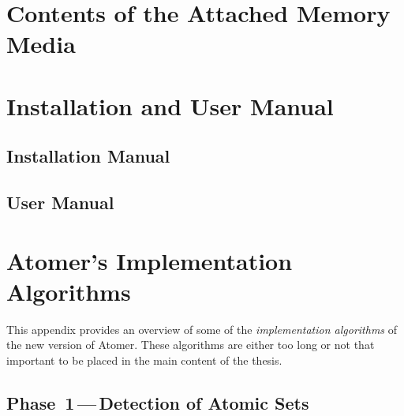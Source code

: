 




\chapter{Contents of the Attached Memory Media}
\label{app:memMedia}







\chapter{Installation and User Manual}
\label{app:man}



\section*{Installation Manual}


\section*{User Manual}






\chapter{Atomer's Implementation Algorithms}
\label{app:alg}

This appendix provides an overview of some of the \emph{implementation algorithms} of the new version of Atomer. These algorithms are either too long or not that important to be placed in the main content of the thesis.


\section*{Phase~1\,---\,Detection of Atomic Sets}

